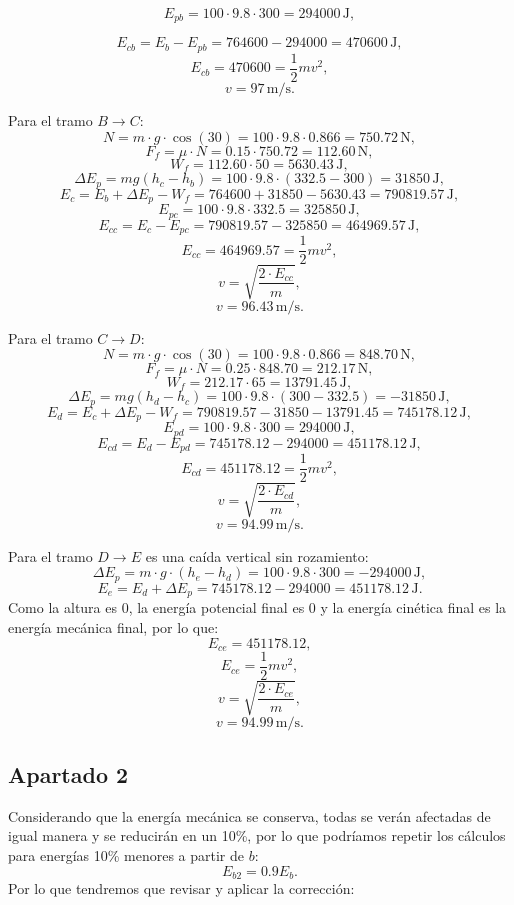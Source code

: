 \documentclass[a4paper,12pt]{article} %
\begin{document}
\[
E_{pb} = 100 \cdot 9.8 \cdot 300 = 294000\,\mathrm{J},
\]

\[
E_{cb} = E_b - E_{pb} = 764600 - 294000 = 470600\,\mathrm{J},
\]
\[
E_{cb} = 470600 = \frac{1}{2} m v^2,
\]
\[
v = 97\,\mathrm{m/s}.
\]

Para el tramo $B \to C$:
\[
N = m \cdot g \cdot \cos(30) = 100 \cdot 9.8 \cdot 0.866 = 750.72\,\mathrm{N},
\]
\[
F_f = \mu \cdot N = 0.15 \cdot 750.72 = 112.60\,\mathrm{N},
\]
\[
W_f = 112.60 \cdot 50 = 5630.43\,\mathrm{J},
\]
\[
\Delta E_p = m g (h_c - h_b) = 100 \cdot 9.8 \cdot (332.5 - 300) = 31850\,\mathrm{J},
\]
\[
E_c = E_b + \Delta E_p - W_f = 764600 + 31850 - 5630.43 = 790819.57\,\mathrm{J},
\]
\[
E_{pc} = 100 \cdot 9.8 \cdot 332.5 = 325850\,\mathrm{J},
\]
\[
E_{cc} = E_c - E_{pc} = 790819.57 - 325850 = 464969.57\,\mathrm{J},
\]
\[
E_{cc} = 464969.57 = \frac{1}{2} m v^2,
\]
\[
v = \sqrt{\frac{2 \cdot E_{cc}}{m}},
\]
\[
v = 96.43\,\mathrm{m/s}.
\]

Para el tramo $C \to D$:
\[
N = m \cdot g \cdot \cos(30) = 100 \cdot 9.8 \cdot 0.866 = 848.70\,\mathrm{N},
\]
\[
F_f = \mu \cdot N = 0.25 \cdot 848.70 = 212.17\,\mathrm{N},
\]
\[
W_f = 212.17 \cdot 65 = 13791.45\,\mathrm{J},
\]
\[
\Delta E_p = m g (h_d - h_c) = 100 \cdot 9.8 \cdot (300 - 332.5) = -31850\,\mathrm{J},
\]
\[
E_d = E_c + \Delta E_p - W_f = 790819.57 - 31850 - 13791.45 = 745178.12\,\mathrm{J},
\]
\[
E_{pd} = 100 \cdot 9.8 \cdot 300 = 294000\,\mathrm{J},
\]
\[
E_{cd} = E_d - E_{pd} = 745178.12 - 294000 = 451178.12\,\mathrm{J},
\]
\[
E_{cd} = 451178.12 = \frac{1}{2} m v^2,
\]
\[
v = \sqrt{\frac{2 \cdot E_{cd}}{m}},
\]
\[
v = 94.99\,\mathrm{m/s}.
\]

Para el tramo $D \to E$ es una caída vertical sin rozamiento:
\[
\Delta E_p = m \cdot g \cdot (h_e - h_d) = 100 \cdot 9.8 \cdot 300 = -294000\,\mathrm{J},
\]
\[
E_e = E_d + \Delta E_p = 745178.12 - 294000 = 451178.12\,\mathrm{J}.
\]
Como la altura es 0, la energía potencial final es 0 y la energía cinética final es la energía mecánica final, por lo que:
\[
E_{ce} = 451178.12,
\]
\[
E_{ce} = \frac{1}{2} m v^2,
\]
\[
v = \sqrt{\frac{2 \cdot E_{ce}}{m}},
\]
\[
v = 94.99\,\mathrm{m/s}.
\]

\subsection*{Apartado 2}
Considerando que la energía mecánica se conserva, todas se verán afectadas de igual manera y se reducirán en un 10\%, por lo que podríamos repetir los cálculos para energías 10\% menores a partir de $b$:
\[
E_{b2} = 0.9 E_b.
\]
Por lo que tendremos que revisar y aplicar la corrección:
\end{document}
